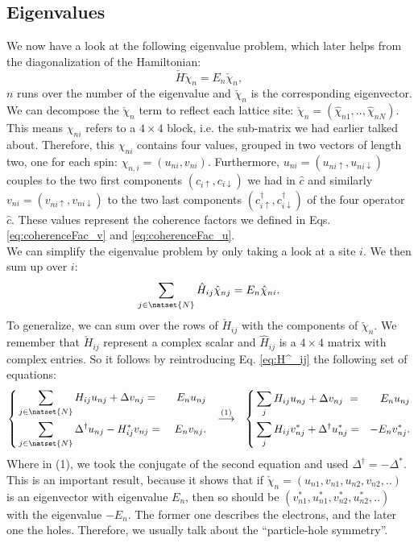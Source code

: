 \documentclass[../main.tex]{subfile}
\begin{document}
\subsection{Eigenvalues}
We now have a look at the following eigenvalue problem, which later helps from the diagonalization of the Hamiltonian:
\begin{equation}
    \label{eq:BdG_eigenVal_H} 
    \check{H} \check{\chi}_n = E_n \check{\chi}_n,
\end{equation}
$n$ runs over the number of the eigenvalue and $\check{\chi}_n$ is the corresponding eigenvector.
We can decompose the $\check{\chi}_n$ term to reflect each lattice site: $\check{\chi}_n = (\hat{\chi}_{n1},..,\hat{\chi}_{nN})$. 
This means $\chi_{ni}$ refers to a $4\times4$ block, i.e. the sub-matrix we had earlier talked about.
Therefore, this $\chi_{ni}$ contains four values, grouped in two vectors of length two, one for each spin: $\chi_{n,i} = (u_{ni}, v_{ni})$.
Furthermore, $u_{ni} = (u_{ni\uparrow}, u_{ni\downarrow})$ couples to the two first components $(c_{i\uparrow},c_{i\downarrow})$ we had in $\hat{c}$ and 
similarly $v_{ni} = (v_{ni\uparrow}, v_{ni\downarrow})$ to the two last components $(c_{i\uparrow}^{\dagger},c_{i\downarrow}^{\dagger})$ of
the four operator $\hat{c}$. These values represent the coherence factors we defined in Eqs. \ref{eq:coherenceFac_v} and \ref{eq:coherenceFac_u}.\\ 

We can simplify the eigenvalue problem by only taking a look at a site $i$. We then sum up over $i$: 
\[
    \sum_{j\in\natset{N}}\hat{H}_{ij} \hat{\chi}_{nj} = E_n \hat{\chi}_{ni}.
\]
To generalize, we can sum over the rows of $\check{H}_{ij}$ with the components of $\check{\chi}_n$.
We remember that $\check{H}_{ij}$ represent a complex scalar and $\hat{H}_{ij}$ is a $4\times4$ matrix with complex entries.
 So it follows by reintroducing Eq. \ref{eq:H^_ij} the following set of equations:
\begin{equation}
    \left\{
    \begin{aligned}
        &\sum_{j\in\natset{N}}H_{ij} u_{nj} + \Delta v_{nj} = &E_n u_{nj}\\
        &\sum_{j\in\natset{N}}\Delta^{\dagger} u_{nj} - H_{ij}^{\ast} v_{nj} =~& E_n v_{nj}.
    \end{aligned}
    \right.~~
    \stackrel{(1)}{\longrightarrow}~~
    \left\{
        \begin{aligned}
            &\sum_{j} H_{ij} u_{nj} + \Delta v_{nj} ~=& E_n u_{nj}\\
            &\sum_{j} H_{ij} v_{nj}^{\ast} + \Delta^{\dagger} u_{nj}^{\ast}= &-E_n v_{nj}^{\ast}.
        \end{aligned}
        \right.
\end{equation}
Where in (1), we took the conjugate of the second equation and used $\Delta^{\dagger} = -\Delta^{\ast}$.
This is an important result, because it shows that if $\check{\chi}_n = (u_{n1}, v_{n1},u_{n2}, v_{n2},.. )$ 
is an eigenvector with eigenvalue $E_n$, then  
so should be $(v_{n1}^{\ast}, u_{n1}^{\ast},v_{n2}^{\ast}, u_{n2}^{\ast},.. )$ with the eigenvalue $-E_n$. The former one describes the electrons, and the later one the holes.
Therefore, we usually talk about the ``particle-hole symmetry''.
\end{document}
